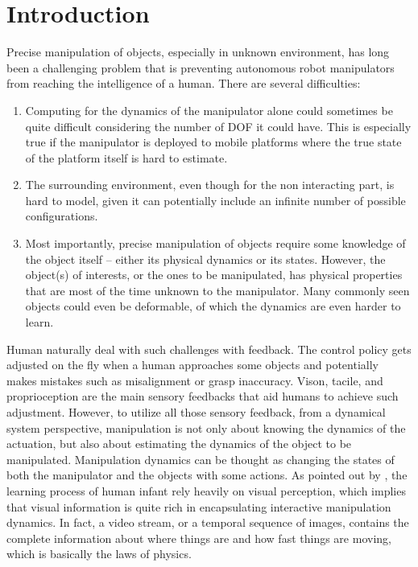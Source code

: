 \documentclass[conference]{IEEEtran}
\begin{document}
\section{Introduction}
Precise manipulation of objects, especially in
unknown environment, has long been a challenging problem that is preventing
autonomous robot manipulators from reaching the intelligence of a human.
There are several difficulties:
\begin{enumerate}
  \item Computing for the dynamics of the manipulator alone could sometimes be
    quite difficult considering the number of DOF it could have. This is especially
    true if the manipulator is deployed to mobile platforms where the true
    state of the platform itself is hard to estimate.
  \item The surrounding environment, even though for the non interacting part,
    is hard to model, given it can potentially include an infinite number of
    possible configurations.
  \item Most importantly, precise manipulation of objects require some knowledge
    of the object itself -- either its physical dynamics or its states.
    However, the object(s) of interests, or the ones to be manipulated,
    has physical properties that are most of the time unknown to the manipulator.
    Many commonly seen objects could even be deformable, of which the dynamics
    are even harder to learn.
\end{enumerate}

Human naturally deal with such challenges with feedback. The control policy gets
adjusted on the fly when a human approaches some objects and potentially makes
mistakes such as misalignment or grasp inaccuracy. Vison, tacile, and proprioception
are the main sensory feedbacks that aid humans to achieve such adjustment. However,
to utilize all those sensory feedback, from a dynamical system perspective,
manipulation is not only about knowing the dynamics
of the actuation, but also about estimating the dynamics of the object to be
manipulated. Manipulation dynamics can be thought as changing
the states of both the manipulator and the objects with some actions.
As pointed out by \citet{imitation},
the learning process of human infant rely heavily on visual
perception, which implies that visual information is quite rich in
encapsulating interactive manipulation dynamics. In fact, a video stream, or
a temporal sequence of images, contains the complete information about where
things are and how fast things are moving, which is basically the laws of physics.
\end{document}
